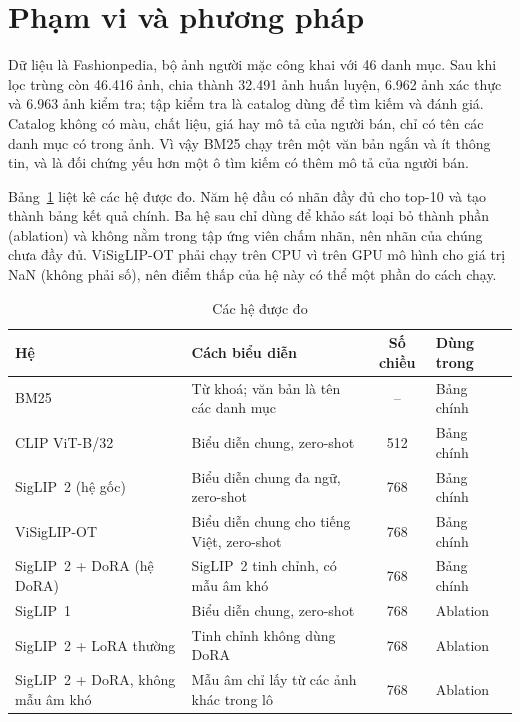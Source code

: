 \section{Phạm vi và phương pháp}
\label{sec:pham-vi}

Dữ liệu là Fashionpedia, bộ ảnh người mặc công khai với 46 danh mục. Sau khi lọc trùng còn 46.416 ảnh, chia thành 32.491 ảnh huấn luyện, 6.962 ảnh xác thực và 6.963 ảnh kiểm tra; tập kiểm tra là catalog dùng để tìm kiếm và đánh giá. Catalog không có màu, chất liệu, giá hay mô tả của người bán, chỉ có tên các danh mục có trong ảnh. Vì vậy BM25 chạy trên một văn bản ngắn và ít thông tin, và là đối chứng yếu hơn một ô tìm kiếm có thêm mô tả của người bán.

Bảng~\ref{tab:ch1-he-thong} liệt kê các hệ được đo. Năm hệ đầu có nhãn đầy đủ cho top-10 và tạo thành bảng kết quả chính. Ba hệ sau chỉ dùng để khảo sát loại bỏ thành phần (ablation) và không nằm trong tập ứng viên chấm nhãn, nên nhãn của chúng chưa đầy đủ. ViSigLIP-OT phải chạy trên CPU vì trên GPU mô hình cho giá trị NaN (không phải số), nên điểm thấp của hệ này có thể một phần do cách chạy.

\begin{table}[H]
\centering
\caption{Các hệ được đo}
\label{tab:ch1-he-thong}
\small
\renewcommand{\arraystretch}{1.08}
\begin{tabularx}{\textwidth}{@{}>{\raggedright\arraybackslash}p{4.6cm} >{\raggedright\arraybackslash}X c l@{}}
\toprule
\textbf{Hệ} & \textbf{Cách biểu diễn} & \textbf{Số chiều} & \textbf{Dùng trong} \\
\midrule
BM25 & Từ khoá; văn bản là tên các danh mục & -- & Bảng chính \\
CLIP ViT-B/32 & Biểu diễn chung, zero-shot & 512 & Bảng chính \\
SigLIP~2 (hệ gốc) & Biểu diễn chung đa ngữ, zero-shot & 768 & Bảng chính \\
ViSigLIP-OT & Biểu diễn chung cho tiếng Việt, zero-shot & 768 & Bảng chính \\
SigLIP~2 + DoRA (hệ DoRA) & SigLIP~2 tinh chỉnh, có mẫu âm khó & 768 & Bảng chính \\
SigLIP~1 & Biểu diễn chung, zero-shot & 768 & Ablation \\
SigLIP~2 + LoRA thường & Tinh chỉnh không dùng DoRA & 768 & Ablation \\
SigLIP~2 + DoRA, không mẫu âm khó & Mẫu âm chỉ lấy từ các ảnh khác trong lô & 768 & Ablation \\
\bottomrule
\end{tabularx}
\end{table}

